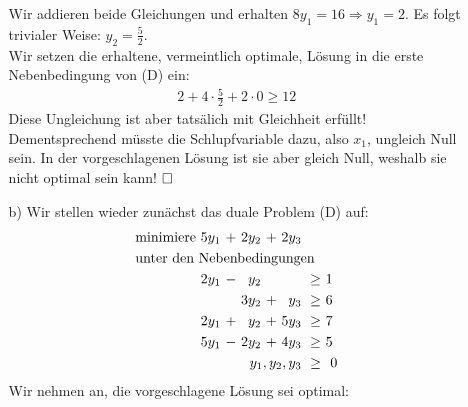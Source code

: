 \documentclass [a4paper,11pt]{article}
\begin{document}
\begin{enumerate}
\begin{enumerate}
                    Wir addieren beide Gleichungen und erhalten $8y_1 = 16 \Rightarrow y_1 = 2$. Es folgt trivialer Weise: $y_2 = \frac{5}{2}$.\\
                    Wir setzen die erhaltene, vermeintlich optimale, Lösung in die erste Nebenbedingung von (D) ein:
                    \begin{align*}
                    2 + 4 \cdot \frac{5}{2} + 2 \cdot 0 \geq 12
                    \end{align*}
                    Diese Ungleichung ist aber tatsälich mit Gleichheit erfüllt! Dementsprechend müsste die Schlupfvariable dazu, also $x_1$, ungleich Null sein.
                    In der vorgeschlagenen Lösung ist sie aber gleich Null, weshalb sie nicht optimal sein kann! $\qed$
                \item[b)]
                    Wir stellen wieder zunächst das duale Problem (D) auf:
                    \begin{align*}
                    \begin{alignedat}{6}
                    & \text{minimiere } & 5y_1 &\ + &\ 2y_2 &\ + &\ 2y_3 & & \\
                    & \rlap{unter den Nebenbedingungen} & & & & & & & \\
                    && 2y_1 &\ - &\  y_2 &    &       &\ \geq &\  1\ \\
                    &&      &    &\ 3y_2 &\ + &\  y_3 &\ \geq &\  6\ \\
                    && 2y_1 &\ + &\  y_2 &\ + &\ 5y_3 &\ \geq &\  7\ \\
                    && 5y_1 &\ - &\ 2y_2 &\ + &\ 4y_3 &\ \geq &\  5\ \\
                    && & & & & \llap{$y_1,y_2,y_3$} &\ \geq &\ 0
                    \end{alignedat}
                    \end{align*}
                    Wir nehmen an, die vorgeschlagene Lösung sei optimal: \\

\end{enumerate}
\end{enumerate}
\end{document}
